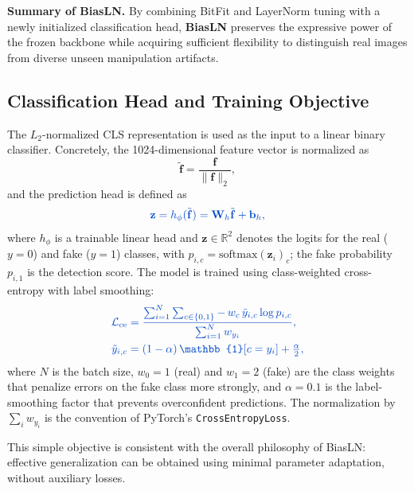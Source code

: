 \documentclass[fonts]{icst}
\newif\ifrevmark\revmarktrue
\newcommand{\rev}[1]{\ifrevmark{\color{revblue}#1}\else#1\fi}
\begin{document}
\vspace{0.5em}
\noindent \textbf{Summary of BiasLN.}
By combining BitFit and LayerNorm tuning with a newly initialized classification head, \textbf{BiasLN} preserves the expressive power of the frozen backbone while acquiring sufficient flexibility to distinguish real images from diverse unseen manipulation artifacts.

\subsection{Classification Head and Training Objective}

The $L_2$-normalized CLS representation is used as the input to a linear binary classifier.
Concretely, the 1024-dimensional feature vector is normalized as
\begin{equation}
\tilde{\mathbf{f}} = \frac{\mathbf{f}}{\lVert \mathbf{f} \rVert_2},
\end{equation}
and the prediction head is defined as
\begin{equation}
\rev{\mathbf{z} = h_{\phi}(\tilde{\mathbf{f}}) = \mathbf{W}_h\tilde{\mathbf{f}}+\mathbf{b}_h,}
\end{equation}
where $h_{\phi}$ is a trainable linear head and \rev{$\mathbf{z} \in \mathbb{R}^2$ denotes the logits for the real ($y=0$) and fake ($y=1$) classes, with $p_{i,c}=\mathrm{softmax}(\mathbf{z}_i)_c$; the fake probability $p_{i,1}$ is the detection score.}
The model is trained using class-weighted cross-entropy with label smoothing:
\begin{equation}
\rev{\begin{aligned}
\mathcal{L}_{\mathrm{ce}}&=\frac{\sum_{i=1}^{N}\sum_{c\in\{0,1\}}-\,w_c\,\tilde{y}_{i,c}\log p_{i,c}}{\sum_{i=1}^{N}w_{y_i}},\\
\tilde{y}_{i,c}&=(1-\alpha)\,\mathbb{1}[c=y_i]+\tfrac{\alpha}{2},
\end{aligned}}
\label{eq:ce}
\end{equation}
\rev{where $N$ is the batch size, $w_0=1$ (real) and $w_1=2$ (fake) are the class weights that penalize errors on the fake class more strongly, and $\alpha=0.1$ is the label-smoothing factor that prevents overconfident predictions. The normalization by $\sum_i w_{y_i}$ is the convention of PyTorch's \texttt{CrossEntropyLoss}.}

This simple objective is consistent with the overall philosophy of BiasLN: effective generalization can be obtained using minimal parameter adaptation\rev{, without auxiliary losses}.
\end{document}
